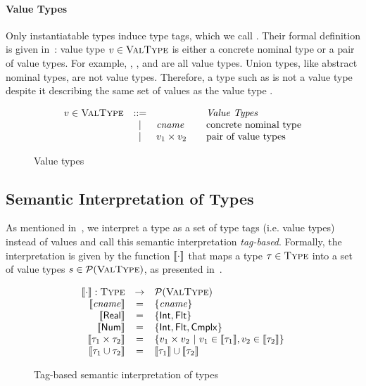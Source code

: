 \paragraph{Value Types}
Only instantiatable types induce type tags,
which we call . 
Their formal definition is given in~:
value type $v \in \textsc{ValType}$ is either a concrete nominal type 
or a pair of value types. 
For example, \tyflt, \typair{\tyint}{\tyint},
and \typair{\tystr}{(\typair{\tyint}{\tyint})} are all value types.
Union types, like abstract nominal types, are not value types.
Therefore, a type such as \tyunion{\tyint}{\tyint} is not a value type 
despite it describing the same set of values as the value type \tyint.

\begin{figure}
	\[
	\begin{array}{rcl@{\qquad}l}
	\vty \in \VType & ::= & & \text{\emph{Value Types}}
	\\ &\Alt& \cname & \text{concrete nominal type}
	\\ &\Alt& \typair{\vty_1}{\vty_2} & \text{pair of value types}
	\end{array}
	\]
	\caption{Value types} %
	\label{fig:bjsem-value-types}
\end{figure}


\subsection{Semantic Interpretation of Types}

As mentioned in~, 
we interpret a type as a set of type tags (i.e. value types) instead of values
and call this semantic interpretation \emph{tag-based}.
Formally, the interpretation is given by the function
$\llbracket \cdot \rrbracket$ that maps a type $\tau \in \textsc{Type}$
into a set of value types $s \in \mathcal{P}(\textsc{ValType})$,
as presented in~.

\begin{figure}
	\[
	\begin{array}{rcl}
	\llbracket \cdot \rrbracket: \textsc{Type} &\rightarrow& \mathcal{P}(\textsc{ValType}) \\
	\llbracket \mathit{cname} \rrbracket  & = & \{\mathit{cname}\} \\
	\llbracket \mathsf{Real} \rrbracket & = & \{ \mathsf{Int}, \mathsf{Flt} \} \\
	\llbracket \mathsf{Num} \rrbracket & = & \{ \mathsf{Int}, \mathsf{Flt}, \mathsf{Cmplx} \} \\
	\llbracket \tau_1 \times \tau_2 \rrbracket & = & \{v_1 \times v_2 
	~\vert~ v_1 \in \llbracket \tau_1 \rrbracket, v_2 \in \llbracket \tau_2 \rrbracket\}\\
	\llbracket \tau_1 \cup \tau_2 \rrbracket & = & 
	\llbracket \tau_1 \rrbracket \cup \llbracket \tau_2 \rrbracket
	\end{array}
	\]
	\caption{Tag-based semantic interpretation of types} %
	\label{fig:bjsem-interpretation}
\end{figure}

